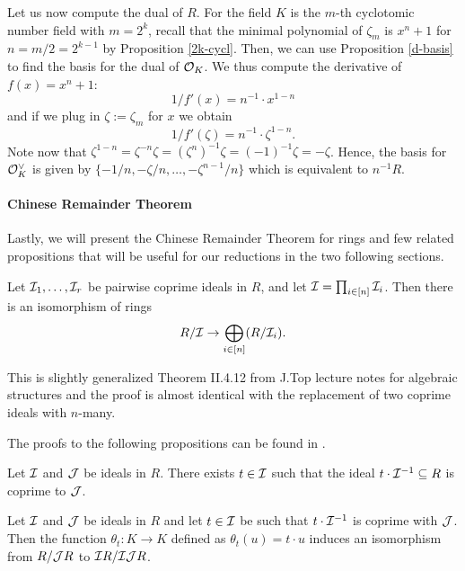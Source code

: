 Let us now compute the dual of $R$. For the field $K$ is the $m$-th cyclotomic number field with $m = 2^k$, recall that the minimal polynomial of $\zeta_m$ is $x^n+1$ for $n = m/2 = 2^{k-1}$ by Proposition \ref{2k-cycl}. Then, we can use Proposition \ref{d-basis} to find the basis for the dual of $\mathcal{O}_K$. We thus compute the derivative of $f(x) = x^n +1$:
\[1/f'(x) = n^{-1} \cdot x^{1-n} \] and if we plug in $\zeta := \zeta_m$ for $x$ we obtain
\[1/f'(\zeta) = n^{-1} \cdot \zeta^{1-n}.\]
Note now that $\zeta^{1-n} = \zeta^{-n} \zeta = (\zeta^n)^{-1} \zeta = (-1)^{-1} \zeta = -\zeta$. Hence, the basis for $\mathcal{O}^{\vee}_K$ is given by $\{-1/n, -\zeta/n, \ldots, -\zeta^{n-1}/n \}$ which is equivalent to $n^{-1}R$.

\paragraph{Chinese Remainder Theorem}
Lastly, we will present the Chinese Remainder Theorem for rings and few related propositions that will be useful for our reductions in the two following sections.

\begin{proposition}\label{crt}
	Let $\mathcal{I}_1, \ldots, \mathcal{I}_r$ be pairwise coprime ideals in $R$, and let $\mathcal{I} = \prod_{i \in [n]} \mathcal{I}_i$. Then there is an isomorphism of rings
	\[ R/\mathcal{I} \rightarrow \bigoplus_{i \in [n]} (R/\mathcal{I}_i). \]
\end{proposition}
This is slightly generalized Theorem II.4.12 from J.Top lecture notes for algebraic structures and the proof is almost identical with the replacement of two coprime ideals with $n$-many.

The proofs to the following propositions can be found in \cite{ring-lwe}.
\begin{proposition}
	Let $\mathcal{I}$ and $\mathcal{J}$ be ideals in $R$. There exists $t \in \mathcal{I}$ such that the ideal $t \cdot \mathcal{I}^{-1} \subseteq R$ is coprime to $\mathcal{J}$.
\end{proposition}

\begin{proposition}\label{sigma-t}
	Let $\mathcal{I}$ and $\mathcal{J}$ be ideals in $R$ and let $t \in \mathcal{I}$ be such that $t \cdot \mathcal{I}^{-1}$ is coprime with $\mathcal{J}$. Then the function $\theta_t : K \rightarrow K$ defined as $\theta_t(u) = t \cdot u$ induces an isomorphism from $R/\mathcal{J} R$ to $\mathcal{I} R/\mathcal{I} \mathcal{J} R$.
\end{proposition}

